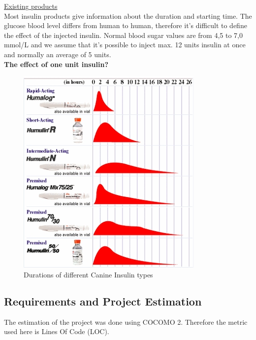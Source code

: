 \underline{Existing products}\\
Most insulin products give information about the duration and starting time. The glucose blood level differs from 
human to human, therefore it's difficult to define the effect of the injected insulin. 
Normal blood sugar values are from 4,5 to 7,0 mmol/L and we assume that it's possible to inject max. 12 units insulin 
at once and normally an average of 5 units.\\
\textbf{The effect of one unit insulin?}
\begin{figure}[htb]
\centering
\includegraphics[width=\textwidth]{images/time_activity.jpg}
\caption{Durations of different Canine Insulin types}
\end{figure}

\subsection{Requirements and Project Estimation}
The estimation of the project was done using COCOMO 2.
Therefore the metric used here is Lines Of Code (LOC).

